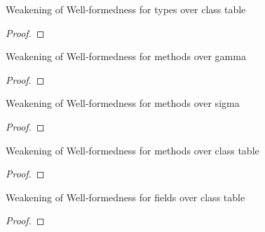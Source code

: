 \documentclass[acmlarge, anonymous, authordraft, review]{acmart} %
\begin{document}
\begin{lemma}{Weakening of Well-formedness for types over class table}{}
  \begin{conds}
    \cond{$\WFtype\K\t$}
  \end{conds}

  \then\axiom{$\WFtype{\K~\Kp}\t$}

  \begin{proof} 
  \end{proof}
\end{lemma}

\begin{lemma}{Weakening of Well-formedness for methods over gamma}{}
  \begin{conds}
    \cond{$\WF\Env\s\K\md$}
  \end{conds}

  \then\axiom{$\WF{\Env~\Envp}\s\K\md$}

  \begin{proof} 
  \end{proof}
\end{lemma}

\begin{lemma}{Weakening of Well-formedness for methods over sigma}{}
  \begin{conds}
    \cond{$\WF\Env\s\K\md$}
  \end{conds}

  \then{}

  \begin{proof} 
  \end{proof}
\end{lemma}

\begin{lemma}{Weakening of Well-formedness for methods over class table}{}
  \begin{conds}
    \cond{$\WF\Env\s\K\md$}
  \end{conds}

  \then\axiom{$\WF\Env\s{\K~\Kp}\md$}

  \begin{proof} 
  \end{proof}
\end{lemma}

\begin{lemma}{Weakening of Well-formedness for fields over class table}{}
  \begin{conds}
    \cond{$\WFtype\K{\Fdef\f\t}$}
  \end{conds}

  \then\axiom{$\WFtype{\K~\Kp}{\Fdef\f\t}$}

  \begin{proof} 
  \end{proof}
\end{lemma}
\end{document}
